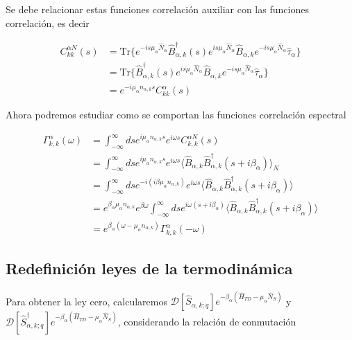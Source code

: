 \begin{appendixs}
Se debe relacionar estas funciones correlación auxiliar con las funciones correlación, es decir

\begin{align*}
    C^{\alpha N}_{kk}(s) & = \text{Tr}\{e^{-is\mu_{\alpha}\hat{N}_{\alpha} }\hat{B}^{\dagger}_{\alpha,k}(s)e^{is\mu_{\alpha}\hat{N}_{\alpha}} \hat{B}_{\alpha,k}e^{-is\mu_{\alpha}\hat{N}_{\alpha} }\hat{\tau}_{\alpha}   \} \\
 & = \text{Tr}\{\hat{B}^{\dagger}_{\alpha,k}(s)e^{is\mu_{\alpha}\hat{N}_{\alpha}} \hat{B}_{\alpha,k}e^{-is\mu_{\alpha}\hat{N}_{\alpha}}\hat{\tau}_{\alpha}   \}\\
 & = e^{-i\mu_{\alpha}n_{\alpha,k}s} C^{\alpha}_{kk}(s)
\end{align*}

Ahora podremos estudiar como se comportan las funciones correlación espectral

\begin{align*}
    \Gamma^{\alpha}_{k,k}(\omega) & = \int_{-\infty}^{\infty}ds e^{i\mu_{\alpha}n_{\alpha,k}s} e^{i\omega s}C^{\alpha N}_{k,k}(s) \\
    & = \int_{-\infty}^{\infty}ds e^{i\mu_{\alpha}n_{\alpha,k}s} e^{i\omega s}\langle \hat{B}_{\alpha,k} \hat{B}^{\dagger}_{\alpha,k}(s+i\beta_{\alpha}) \rangle_{N} \\
    & = \int_{-\infty}^{\infty}ds e^{-i(i\beta \mu_{\alpha}n_{\alpha,k})} e^{i\omega s} \langle \hat{B}_{\alpha,k}\hat{B}^{\dagger}_{\alpha,k}(s+i\beta_{\alpha}) \rangle \\
    & = e^{\beta_{\alpha}\mu_{\alpha}n_{\alpha,k}}e^{\beta \omega} \int_{-\infty}^{\infty} ds e^{i\omega(s+i\beta_{\alpha})} \langle \hat{B}_{\alpha,k}\hat{B}^{\dagger}_{\alpha,k}(s+i\beta_{\alpha}) \rangle \\
    & = e^{\beta_{\alpha}(\omega - \mu_{\alpha}n_{\alpha,k})} \Gamma^{\alpha}_{k,k}(-\omega)
\end{align*}

\label{apendixKMS}


\newpage

\subsection{Redefinición leyes de la termodinámica}
Para obtener la ley cero, calcularemos $\mathcal{D}[\hat{S}_{\alpha,k;q}]e^{-\beta_{\alpha}(\hat{H}_{TD} - \mu_{\alpha}\hat{N}_{S})}$ y $\mathcal{D}[\hat{S}^{\dagger}_{\alpha,k;q}]e^{-\beta_{\alpha}(\hat{H}_{TD} - \mu_{\alpha}\hat{N}_{S})}$, considerando la relación de conmutación


\end{appendixs}
